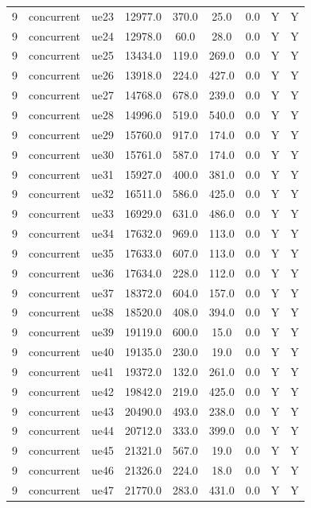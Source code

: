 \begin{table}[ht]
\begin{tabular}{|c|c|c|c|c|c|c|c|c|}
9 & concurrent & ue23 & 12977.0 & 370.0 & 25.0 & 0.0 & Y & Y \\
9 & concurrent & ue24 & 12978.0 & 60.0 & 28.0 & 0.0 & Y & Y \\
9 & concurrent & ue25 & 13434.0 & 119.0 & 269.0 & 0.0 & Y & Y \\
9 & concurrent & ue26 & 13918.0 & 224.0 & 427.0 & 0.0 & Y & Y \\
9 & concurrent & ue27 & 14768.0 & 678.0 & 239.0 & 0.0 & Y & Y \\
9 & concurrent & ue28 & 14996.0 & 519.0 & 540.0 & 0.0 & Y & Y \\
9 & concurrent & ue29 & 15760.0 & 917.0 & 174.0 & 0.0 & Y & Y \\
9 & concurrent & ue30 & 15761.0 & 587.0 & 174.0 & 0.0 & Y & Y \\
9 & concurrent & ue31 & 15927.0 & 400.0 & 381.0 & 0.0 & Y & Y \\
9 & concurrent & ue32 & 16511.0 & 586.0 & 425.0 & 0.0 & Y & Y \\
9 & concurrent & ue33 & 16929.0 & 631.0 & 486.0 & 0.0 & Y & Y \\
9 & concurrent & ue34 & 17632.0 & 969.0 & 113.0 & 0.0 & Y & Y \\
9 & concurrent & ue35 & 17633.0 & 607.0 & 113.0 & 0.0 & Y & Y \\
9 & concurrent & ue36 & 17634.0 & 228.0 & 112.0 & 0.0 & Y & Y \\
9 & concurrent & ue37 & 18372.0 & 604.0 & 157.0 & 0.0 & Y & Y \\
9 & concurrent & ue38 & 18520.0 & 408.0 & 394.0 & 0.0 & Y & Y \\
9 & concurrent & ue39 & 19119.0 & 600.0 & 15.0 & 0.0 & Y & Y \\
9 & concurrent & ue40 & 19135.0 & 230.0 & 19.0 & 0.0 & Y & Y \\
9 & concurrent & ue41 & 19372.0 & 132.0 & 261.0 & 0.0 & Y & Y \\
9 & concurrent & ue42 & 19842.0 & 219.0 & 425.0 & 0.0 & Y & Y \\
9 & concurrent & ue43 & 20490.0 & 493.0 & 238.0 & 0.0 & Y & Y \\
9 & concurrent & ue44 & 20712.0 & 333.0 & 399.0 & 0.0 & Y & Y \\
9 & concurrent & ue45 & 21321.0 & 567.0 & 19.0 & 0.0 & Y & Y \\
9 & concurrent & ue46 & 21326.0 & 224.0 & 18.0 & 0.0 & Y & Y \\
9 & concurrent & ue47 & 21770.0 & 283.0 & 431.0 & 0.0 & Y & Y \\

\end{tabular}
\end{table}
